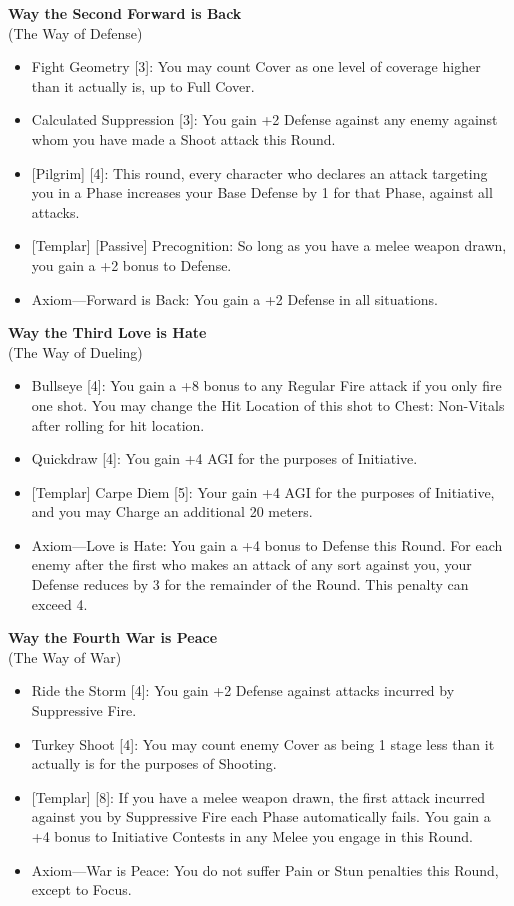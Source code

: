\documentclass[a4paper, twocolumn, openany]{book}
\begin{document}
{{\bfseries Way the Second Forward is Back\\}
(The Way of Defense)\\
\begin{itemize}
\item Fight Geometry [3]: You may count Cover as one level of coverage higher than it actually
is, up to Full Cover.
\item Calculated Suppression [3]: You gain +2 Defense against any enemy against whom you
have made a Shoot attack this Round.
\item {[}Pilgrim{]} [4]: This round, every character who declares an attack targeting you in a Phase
increases your Base Defense by 1 for that Phase, against all attacks.
\item {[}Templar{]} [Passive] Precognition: So long as you have a melee weapon drawn, you gain
a +2 bonus to Defense.
\item Axiom—Forward is Back: You gain a +2 Defense in all situations.\\[\baselineskip]
\end{itemize}

{\bfseries Way the Third Love is Hate\\}
(The Way of Dueling)\\
\begin{itemize}
\item Bullseye [4]: You gain a +8 bonus to any Regular Fire attack if you only fire one shot. You may
change the Hit Location of this shot to Chest: Non-Vitals after rolling for hit location.
\item Quickdraw [4]: You gain +4 AGI for the purposes of Initiative.
\item {[}Templar{]} Carpe Diem [5]: Your gain +4 AGI for the purposes of Initiative, and you may Charge an
additional 20 meters.
\item Axiom—Love is Hate: You gain a +4 bonus to Defense this Round. For each enemy after the first
who makes an attack of any sort against you, your Defense reduces by 3 for the remainder of the
Round. This penalty can exceed 4.\\[\baselineskip]
\end{itemize}

\newpage %
{\bfseries Way the Fourth War is Peace\\}
(The Way of War)\\
\begin{itemize}
\item Ride the Storm [4]: You gain +2 Defense against attacks incurred by Suppressive Fire.
\item Turkey Shoot [4]: You may count enemy Cover as being 1 stage less than it actually is
for the purposes of Shooting.
\item {[}Templar{]} [8]: If you have a melee weapon drawn, the first attack incurred against you by
Suppressive Fire each Phase automatically fails. You gain a +4 bonus to Initiative
Contests in any Melee you engage in this Round.
\item Axiom—War is Peace: You do not suffer Pain or Stun penalties this Round, except to
Focus.\\[\baselineskip]
\end{itemize}

}
\end{document}
